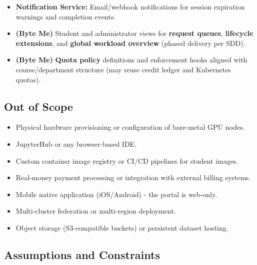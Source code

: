 \documentclass[12pt,a4paper]{article}
\begin{document}
\begin{itemize}[leftmargin=1.5em]
  \item \textbf{Notification Service:} Email/webhook notifications for session expiration warnings and completion events.
  \item \textbf{(Byte Me)} Student and administrator views for \textbf{request queues}, \textbf{lifecycle extensions}, and \textbf{global workload overview} (phased delivery per SDD).
  \item \textbf{(Byte Me)} \textbf{Quota policy} definitions and enforcement hooks aligned with course/department structure (may reuse credit ledger and Kubernetes quotas).
\end{itemize}

\subsection{Out of Scope}

\begin{itemize}[leftmargin=1.5em]
  \item Physical hardware provisioning or configuration of bare-metal GPU nodes.
  \item JupyterHub or any browser-based IDE.
  \item Custom container image registry or CI/CD pipelines for student images.
  \item Real-money payment processing or integration with external billing systems.
  \item Mobile native application (iOS/Android) - the portal is web-only.
  \item Multi-cluster federation or multi-region deployment.
  \item Object storage (S3-compatible buckets) or persistent dataset hosting.
\end{itemize}

\subsection{Assumptions and Constraints}
\end{document}
